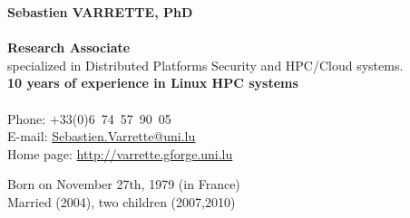 \documentclass{cv}
\begin{document}
\begin{chapeau}
    \begin{adresse}
        {\Large\textbf{Sebastien VARRETTE, PhD}}\\
        \ligne\\
        \textbf{Research Associate}\\
        specialized in Distributed Platforms Security and HPC/Cloud systems.\\
        \textbf{10 years of experience in Linux HPC systems}\\
        \ligne\\
        Phone: +33(0)6~74~57~90~05\\
        E-mail:    \url{Sebastien.Varrette@uni.lu}\\
        Home page: \url{http://varrette.gforge.uni.lu}
    \end{adresse}
    \begin{etatcivil}

        Born on November 27th, 1979 (in France)\\
        Married (2004), two children (2007,2010)\\
    \end{etatcivil}
\end{chapeau}
\end{document}
